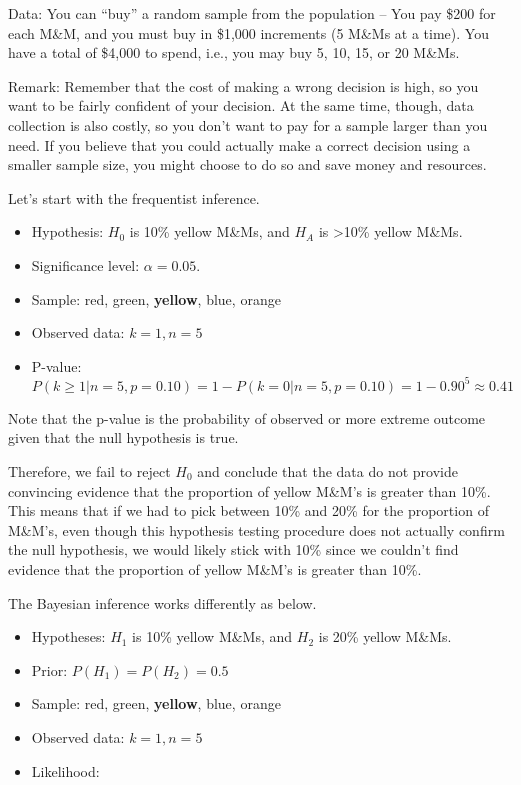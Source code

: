 \documentclass[]{book}
\theoremstyle{definition}
\theoremstyle{definition}
\theoremstyle{remark}
\begin{document}
Data: You can ``buy'' a random sample from the population -- You pay
\$200 for each M\&M, and you must buy in \$1,000 increments (5 M\&Ms at
a time). You have a total of \$4,000 to spend, i.e., you may buy 5, 10,
15, or 20 M\&Ms.

Remark: Remember that the cost of making a wrong decision is high, so
you want to be fairly confident of your decision. At the same time,
though, data collection is also costly, so you don't want to pay for a
sample larger than you need. If you believe that you could actually make
a correct decision using a smaller sample size, you might choose to do
so and save money and resources.

Let's start with the frequentist inference.

\begin{itemize}
\item
  Hypothesis: \(H_0\) is 10\% yellow M\&Ms, and \(H_A\) is
  \textgreater{}10\% yellow M\&Ms.
\item
  Significance level: \(\alpha = 0.05\).
\item
  Sample: red, green, \textbf{yellow}, blue, orange
\item
  Observed data: \(k=1, n=5\)
\item
  P-value:
  \(P(k \geq 1 | n=5, p=0.10) = 1 - P(k=0 | n=5, p=0.10) = 1 - 0.90^5 \approx 0.41\)
\end{itemize}

Note that the p-value is the probability of observed or more extreme
outcome given that the null hypothesis is true.

Therefore, we fail to reject \(H_0\) and conclude that the data do not
provide convincing evidence that the proportion of yellow M\&M's is
greater than 10\%. This means that if we had to pick between 10\% and
20\% for the proportion of M\&M's, even though this hypothesis testing
procedure does not actually confirm the null hypothesis, we would likely
stick with 10\% since we couldn't find evidence that the proportion of
yellow M\&M's is greater than 10\%.

The Bayesian inference works differently as below.

\begin{itemize}
\item
  Hypotheses: \(H_1\) is 10\% yellow M\&Ms, and \(H_2\) is 20\% yellow
  M\&Ms.
\item
  Prior: \(P(H_1) = P(H_2) = 0.5\)
\item
  Sample: red, green, \textbf{yellow}, blue, orange
\item
  Observed data: \(k=1, n=5\)
\item
  Likelihood:
\end{itemize}
\end{document}

